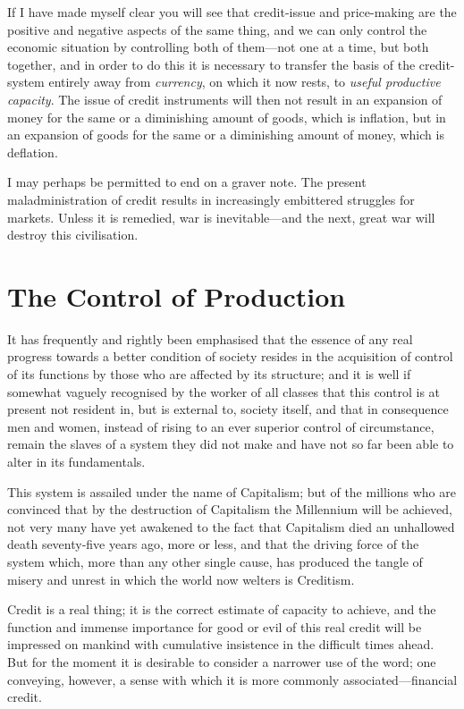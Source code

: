 \documentclass{book}
\begin{document}
If I have made myself clear you will see that credit-issue and price-making are the positive and negative aspects of the same thing, and we can only control the economic situation by controlling both of them—not one at a time, but both together, and in order to do this it is necessary to transfer the basis of the credit-system entirely away from \emph{currency}, on which it now rests, to \emph{useful productive capacity}. The issue of credit instruments will then not result in an expansion of money for the same or a diminishing amount of goods, which is inflation, but in an expansion of goods for the same or a diminishing amount of money, which is deflation.

I may perhaps be permitted to end on a graver note. The present maladministration of credit results in increasingly embittered struggles for markets. Unless it is remedied, war is inevitable—and the next, great war will destroy this civilisation.

\chapter{The Control of Production}
\label{chapter-3}
It has frequently and rightly been emphasised that the essence of any real progress towards a better condition of society resides in the acquisition of control of its functions by those who are affected by its structure; and it is well if somewhat vaguely recognised by the worker of all classes that this control is at present not resident in, but is external to, society itself, and that in consequence men and women, instead of rising to an ever superior control of circumstance, remain the slaves of a system they did not make and have not so far been able to alter in its fundamentals.

This system is assailed under the name of Capitalism; but of the millions who are convinced that by the destruction of Capitalism the Millennium will be achieved, not very many have yet awakened to the fact that Capitalism died an unhallowed death seventy-five years ago, more or less, and that the driving force of the system which, more than any other single cause, has produced the tangle of misery and unrest in which the world now welters is Creditism.

Credit is a real thing; it is the correct estimate of capacity to achieve, and the function and immense importance for good or evil of this real credit will be impressed on mankind with cumulative insistence in the difficult times ahead. But for the moment it is desirable to consider a narrower use of the word; one conveying, however, a sense with which it is more commonly associated—financial credit.
\end{document}
